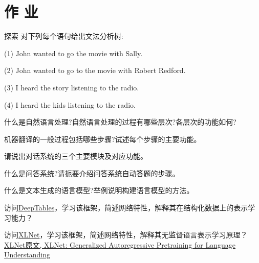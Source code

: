 \section{作 业 }
\begin{custom}[explorecolor]{探索}
对下列每个语句给出文法分析树:

    (1)  John  wanted  to  go  the  movie  with  Sally.

    (2)  John  wanted  to  go  to  the  movie  with  Robert  Redford.

    (3)  I  heard  the  story  listening  to  the  radio.

    (4)  I  heard  the  kids  listening  to  the  radio.
\end{custom}

\begin{think}
    什么是自然语言处理?自然语言处理的过程有哪些层次?各层次的功能如何?
\end{think}

\begin{think}
    机器翻译的一般过程包括哪些步骤?试述每个步骤的主要功能。
\end{think}
\begin{think}
    请说出对话系统的三个主要模块及对应功能。
\end{think}

\begin{think}
    什么是问答系统?请扼要介绍问答系统自动答题的步骤。
\end{think}

\begin{think}
    什么是文本生成的语言模型?举例说明构建语言模型的方法。
\end{think}

\begin{think}
    访问\href{https://github.com/DataCanvasIO/deeptables}{DeepTables}，学习该框架，简述网络特性，解释其在结构化数据上的表示学习能力？
\end{think}

\begin{think}
    访问\href{https://github.com/zggl/xlnet}{​XLNet}，学习该框架，简述网络特性，解释其无监督语言表示学习原理？
    \href{https://arxiv.org/abs/1906.08237}{​XLNet原文, ​XLNet: Generalized Autoregressive Pretraining for Language Understanding}
%

\end{think} 